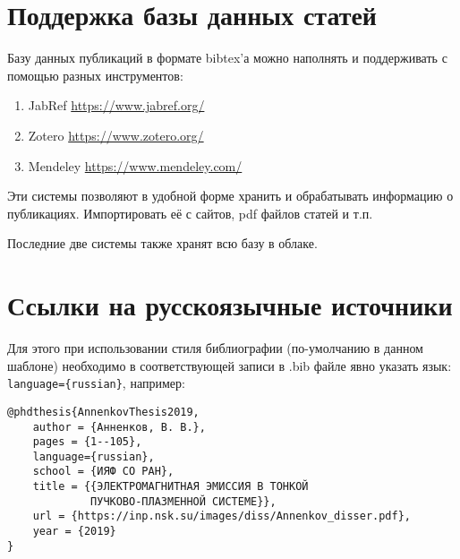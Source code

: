 \section{Поддержка базы данных статей}

Базу данных публикаций в формате bibtex'а можно наполнять и поддерживать с помощью разных инструментов:

\begin{enumerate}
	\item JabRef \href{https://www.jabref.org/}{https://www.jabref.org/} 
	\item Zotero \href{https://www.zotero.org/}{https://www.zotero.org/}
	\item Mendeley \href{https://www.mendeley.com/}{https://www.mendeley.com/}
\end{enumerate}

Эти системы позволяют в удобной форме хранить и обрабатывать информацию о публикациях. Импортировать её с сайтов, pdf файлов статей и т.п.

Последние две системы также хранят всю базу в облаке.


\section{Ссылки на русскоязычные источники}

Для этого при использовании \verb*|| стиля библиографии  (по-умолчанию в данном шаблоне) необходимо в соответствующей записи в .bib файле явно указать язык: \verb*|language={russian}|, например:

\begin{verbatim}
@phdthesis{AnnenkovThesis2019,
	author = {Анненков, В. В.},
	pages = {1--105},
	language={russian},
	school = {ИЯФ СО РАН},
	title = {{ЭЛЕКТРОМАГНИТНАЯ ЭМИССИЯ В ТОНКОЙ
			 ПУЧКОВО-ПЛАЗМЕННОЙ СИСТЕМЕ}},
	url = {https://inp.nsk.su/images/diss/Annenkov_disser.pdf},
	year = {2019}
}
\end{verbatim}


